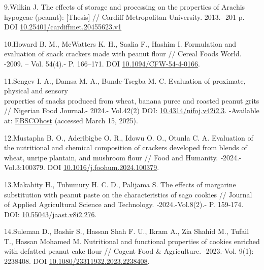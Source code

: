 \begin{references}
9.Wilkin J. The effects of storage and processing on the properties of
Arachis hypogeae (peanut): {[}Thesis{]} // Cardiff Metropolitan
University. 2013.- 201 p. DOI
\href{https://doi.org/10.25401/cardiffmet.20455623.v1}{10.25401/cardiffmet.20455623.v1}

10.Howard B. M., McWatters K. H., Saalia F., Hashim I. Formulation and
evaluation of snack crackers made with peanut flour // Cereal Foods
World. -2009. -- Vol. 54(4).- P. 166--171. DOI
\href{https://doi.org/10.1094/CFW-54-4-0166}{10.1094/CFW-54-4-0166}.

11.Sengev I. A., Damsa M. A., Bunde-Tsegba M. C. Evaluation of
proximate, physical and sensory \\properties of snacks produced from
wheat, banana puree and roasted peanut grits // Nigerian Food Journal.-
2024.- Vol.42(2) DOI:
\href{https://openurl.ebsco.com/EPDB\%3Agcd\%3A9\%3A2629225/detailv2?sid=ebsco\%3Aplink\%3Ascholar&id=ebsco\%3Agcd\%3A182511032&crl=c&link_origin=none}{10.4314/nifoj.v42i2.3}.
-Available at:
\href{https://openurl.ebsco.com/EPDB\%3Agcd\%3A9\%3A2629225/detailv2?sid=ebsco\%3Aplink\%3Ascholar&id=ebsco\%3Agcd\%3A182511032&crl=c&link_origin=none}{EBSCOhost}
(accessed March 15, 2025).

12.Mustapha B. O., Aderibigbe O. R., Idowu O. O., Otunla C. A.
Evaluation of the nutritional and chemical composition of crackers
developed from blends of wheat, unripe plantain, and mushroom flour //
Food and Humanity. \emph{-}2024.-Vol.3:100379. DOI
\href{https://doi.org/10.1016/j.foohum.2024.100379}{10.1016/j.foohum.2024.100379}.

13.Makahity H., Tuhumury H. C. D., Palijama S. The effects of margarine
substitution with peanut paste on the characteristics of sago cookies //
Journal of Applied Agricultural Science and Technology.
\emph{-}2024.-Vol.8(2).- P. 159-174. DOI:
\href{https://doi.org/10.55043/jaast.v8i2.276}{10.55043/jaast.v8i2.276}.

14.Suleman D., Bashir S., Hassan Shah F. U., Ikram A., Zia Shahid M.,
Tufail T., Hassan Mohamed M. Nutritional and functional properties of
cookies enriched with defatted peanut cake flour // Cogent Food \&
Agriculture. -2023.-Vol. 9(1): 2238408. DOI
\href{https://doi.org/10.1080/23311932.2023.2238408}{10.1080/23311932.2023.2238408}.
\end{references}

